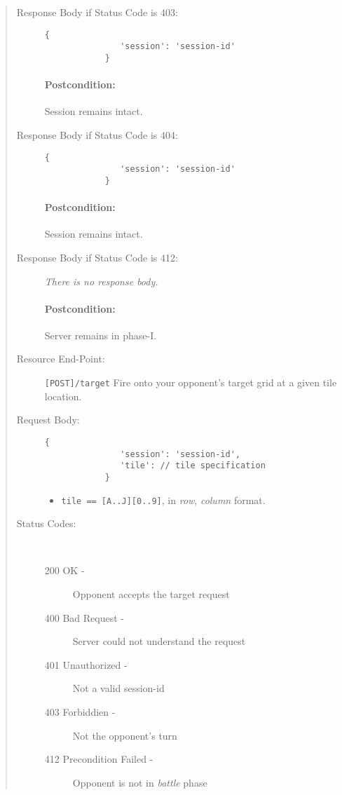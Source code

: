 \documentclass[10pt]{article}
\begin{document}
\begin{quote}
\begin{description}
      \item[Response Body if Status Code is 403:]
         \begin{lstlisting}[gobble=12]
            {
               'session': 'session-id'
            }
         \end{lstlisting}

         \paragraph{Postcondition:} Session remains intact.

      \item[Response Body if Status Code is 404:]
         \begin{lstlisting}[gobble=12]
            {
               'session': 'session-id'
            }
         \end{lstlisting}

         \paragraph{Postcondition:} Session remains intact.

      \item[Response Body if Status Code is 412:] \emph{There is no response body.}
      
         \paragraph{Postcondition:} Server remains in phase-I.
      
      \item[Resource End-Point:] \lstinline|[POST]/target| Fire onto your opponent's target grid at a given tile location.
      \item[Request Body:]
         \begin{lstlisting}[gobble=12]
            {
               'session': 'session-id',
               'tile': // tile specification
            }
         \end{lstlisting}
         \begin{itemize}
            \item \lstinline|tile == [A..J][0..9]|, in \emph{row}, \emph{column} format.
         \end{itemize}
      \item[Status Codes:] ~
         \begin{description}
            \item[200 OK -] Opponent accepts the target request
            \item[400 Bad Request -] Server could not understand the request
            \item[401 Unauthorized -] Not a valid session-id
            \item[403 Forbiddien -] Not the opponent's turn 
            \item[412 Precondition Failed -] Opponent is not in \emph{battle} phase    
         \end{description}


\end{description}
\end{quote}
\end{document}
